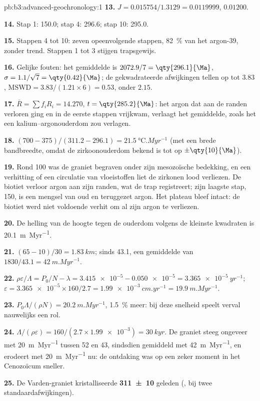 \begin{solution}{pb:b3:advanced-geochronology:1}
\textbf{13.} $J = 0.015754/1.3129 = 0.0119999$, $0.01200$.

\textbf{14.} Stap 1: \qty{150.0}{\Ma}; stap 4: \qty{296.6}{\Ma}; stap 10:
\qty{295.0}{\Ma}.

\textbf{15.} Stappen 4 tot 10: zeven opeenvolgende stappen, \qty{82}{\percent} van het
argon-39, zonder trend. Stappen 1 tot 3 stijgen trapsgewijs.

\textbf{16.} Gelijke fouten: het gemiddelde is $2072.9/7 = \qty{296.1}{\Ma}$, $\sigma =
1.1/\sqrt7 = \qty{0.42}{\Ma}$; de gekwadrateerde afwijkingen tellen op tot $3.83$,
$\mathrm{MSWD} = 3.83/(1.21\times6) = 0.53$, onder $2.15$.

\textbf{17.} $\bar R = \sum f_iR_i = 14.270$, $t = \qty{285.2}{\Ma}$: het
argon dat aan de randen verloren ging en in de eerste stappen vrijkwam, verlaagt het gemiddelde, zoals
het een kalium--argonouderdom zou verlagen.

\textbf{18.} $(700 - 375)/(311.2 - 296.1) = \qty{21.5}{\celsius.Myr^{-1}}$
(met een brede bandbreedte, omdat de zirkoonouderdom bekend is tot op $\pm\qty{10}{\Ma}$).

\textbf{19.} Rond \qty{100}{\Ma} was de graniet begraven onder zijn mesozoïsche
bedekking, en een verhitting of een circulatie van vloeistoffen liet de zirkonen lood verliezen.
De biotiet verloor argon aan zijn randen, wat de trap registreert; zijn
laagste stap, \qty{150}{\Ma}, is een mengsel van oud en teruggezet argon. Het plateau
bleef intact: de biotiet werd niet voldoende verhit om al zijn argon te verliezen.

\textbf{20.} De helling van de hoogte tegen de ouderdom volgens de kleinste
kwadraten is \qty{20.1}{m.Myr^{-1}}.

\textbf{21.} $(65 - 10)/30 = \qty{1.83}{km}$; sinds \qty{43.1}{\Ma}, een gemiddelde van
$1830/43.1 = \qty{42}{m.Myr^{-1}}$.

\textbf{22.} $\rho\varepsilon/\Lambda = P_0/N - \lambda = \num{3.415e-5} -
\num{0.050e-5} = \qty{3.365e-5}{yr^{-1}}$; $\varepsilon = \num{3.365e-5}\times
160/2.7 = \qty{1.99e-3}{cm.yr^{-1}} = \qty{19.9}{m.Myr^{-1}}$.

\textbf{23.} $P_0\Lambda/(\rho N) = \qty{20.2}{m.Myr^{-1}}$, \qty{1.5}{\percent}
meer: bij deze snelheid speelt verval nauwelijks een rol.

\textbf{24.} $\Lambda/(\rho\varepsilon) = 160/(2.7\times\num{1.99e-3}) =
\qty{30}{kyr}$. De graniet steeg ongeveer met \qty{20}{m.Myr^{-1}} tussen 52 en
\qty{43}{\Ma}, sindsdien gemiddeld met \qty{42}{m.Myr^{-1}}, en erodeert
met \qty{20}{m.Myr^{-1}} nu: de ontdaking was op een zeker moment in het
Cenozoïcum sneller.

\textbf{25.} De Varden-graniet kristalliseerde
\textbf{\qty[text-series-to-math=true, separate-uncertainty=true]{311 \pm 10}{\Ma}} geleden (,
bij twee standaardafwijkingen).
\end{solution}
